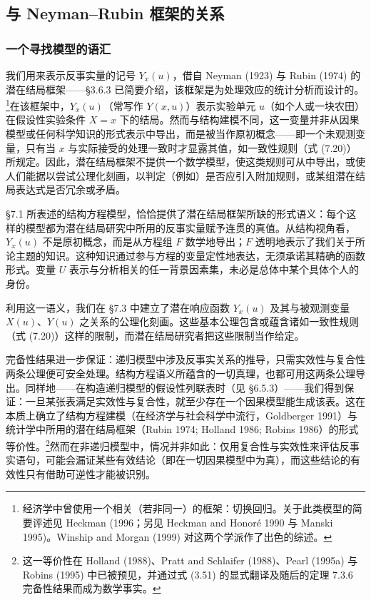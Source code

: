 \subsection{与 Neyman–Rubin 框架的关系}

\subsubsection*{一个寻找模型的语汇}

我们用来表示反事实量的记号 $Y_x(u)$，借自 Neyman (1923) 与 Rubin (1974) 的潜在结局框架——\S 3.6.3 已简要介绍，该框架是为处理效应的统计分析而设计的。\footnote{经济学中曾使用一个相关（若非同一）的框架：切换回归。关于此类模型的简要评述见 Heckman (1996；另见 Heckman and Honoré 1990 与 Manski 1995)。Winship and Morgan (1999) 对这两个学派作了出色的综述。}在该框架中，$Y_x(u)$（常写作 $Y(x,u)$）表示实验单元 $u$（如个人或一块农田）在假设性实验条件 $X=x$ 下的结局。然而与结构建模不同，这一变量并非从因果模型或任何科学知识的形式表示中导出，而是被当作原初概念——即一个未观测变量，只有当 $x$ 与实际接受的处理一致时才显露其值，如一致性规则（式 \textup{(7.20)}）所规定。因此，潜在结局框架不提供一个数学模型，使这类规则可从中导出，或使人们能据以尝试公理化刻画，以判定（例如）是否应引入附加规则，或某组潜在结局表达式是否冗余或矛盾。

\S 7.1 所表述的结构方程模型，恰恰提供了潜在结局框架所缺的形式语义：每个这样的模型都为潜在结局研究中所用的反事实量赋予连贯的真值。从结构视角看，$Y_x(u)$ 不是原初概念，而是从方程组 $F$ 数学地导出；$F$ 透明地表示了我们关于所论主题的知识。这种知识通过参与方程的变量定性地表达，无须承诺其精确的函数形式。变量 $U$ 表示与分析相关的任一背景因素集，未必是总体中某个具体个人的身份。

利用这一语义，我们在 \S 7.3 中建立了潜在响应函数 $Y_x(u)$ 及其与被观测变量 $X(u)$、$Y(u)$ 之关系的公理化刻画。这些基本公理包含或蕴含诸如一致性规则（式 \textup{(7.20)}）这样的限制，而潜在结局研究者把这些限制当作给定。

完备性结果进一步保证：递归模型中涉及反事实关系的推导，只需实效性与复合性两条公理便可安全处理。结构方程语义所蕴含的一切真理，也都可用这两条公理导出。同样地——在构造递归模型的假设性列联表时（见 \S 6.5.3）——我们得到保证：一旦某张表满足实效性与复合性，就至少存在一个因果模型能生成该表。这在本质上确立了结构方程建模（在经济学与社会科学中流行，Goldberger 1991）与统计学中所用的潜在结局框架（Rubin 1974; Holland 1986; Robins 1986）的形式等价性。\footnote{这一等价性在 Holland (1988)、Pratt and Schlaifer (1988)、Pearl (1995a) 与 Robins (1995) 中已被预见，并通过式 \textup{(3.51)} 的显式翻译及随后的定理 7.3.6 完备性结果而成为数学事实。}然而在非递归模型中，情况并非如此：仅用复合性与实效性来评估反事实语句，可能会漏证某些有效结论（即在一切因果模型中为真），而这些结论的有效性只有借助可逆性才能被识别。

